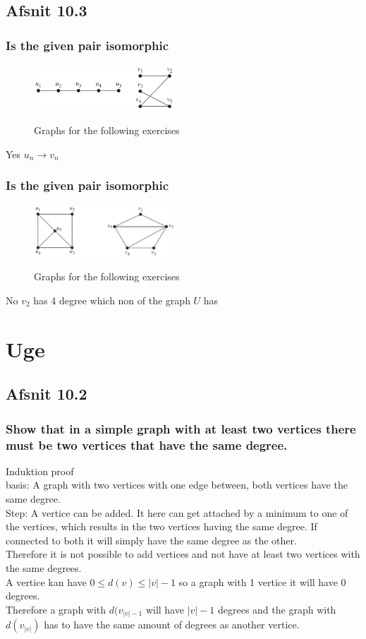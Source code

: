 \documentclass[12pt, a4paper]{report}
\begin{document}
	\section{Afsnit 10.3}
		\setcounter{subsection}{37}
		\subsection{Is the given pair isomorphic}
			\begin{figure}[h!]
				\centering
			\includegraphics[width=200px]{assets/10,3,38.png}
				\label{}
				\caption{Graphs for the following exercises}
			\end{figure}
			Yes $u_n\rightarrow v_n$\clearpage
		\setcounter{subsection}{39}
		\subsection{Is the given pair isomorphic}
			\begin{figure}[h!]
				\centering
			\includegraphics[width=200px]{assets/10,3,40.png}
				\label{}
				\caption{Graphs for the following exercises}
			\end{figure}
			No $v_2$ has 4 degree which non of the graph $U$ has
\chapter{Uge}
	\section{Afsnit 10.2}
		\setcounter{subsection}{17}
		\subsection{Show that in a simple graph with at least two vertices there must be two vertices that have the same degree.}
			Induktion proof\\
			basis: A graph with two vertices with one edge between, both vertices have the same degree.\\
			Step: A vertice can be added. It here can get attached by a minimum to one of the vertices, which results in the two vertices having the same degree. If connected to both it will simply have the same degree as the other.\\
			Therefore it is not possible to add vertices and not have at least two vertices with the same degrees.\\
			A vertice kan have $0\leq d(v)\leq |v|-1$ so a graph with 1 vertice it will have 0 degrees.\\
			Therefore a graph with $d(v_{|v|-1}$ will have $|v|-1$ degrees and the graph with $d(v_{|v|})$ has to have the same amount of degrees as another vertice.
\end{document}
